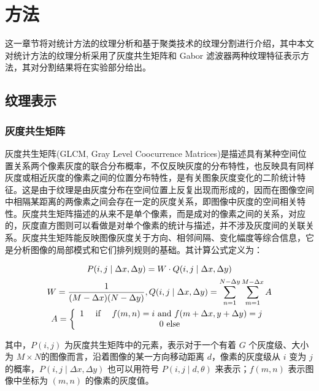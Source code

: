 \section{方法} 
\label{sec:proposed}

这一章节将对统计方法的纹理分析和基于聚类技术的纹理分割进行介绍，其中本文对统计方法的纹理分析采用了灰度共生矩阵和 Gabor 滤波器两种纹理特征表示方法，其对分割结果将在实验部分给出。

\subsection{纹理表示}

\subsubsection{灰度共生矩阵}

灰度共生矩阵(GLCM, Gray Level Coocurrence Matrices)是描述具有某种空间位置关系两个像素灰度的联合分布概率，不仅反映灰度的分布特性，也反映具有同样灰度或相近灰度的像素之间的位置分布特性，是有关图象灰度变化的二阶统计特征。这是由于纹理是由灰度分布在空间位置上反复出现而形成的，因而在图像空间中相隔某距离的两像素之间会存在一定的灰度关系，即图像中灰度的空间相关特性。灰度共生矩阵描述的从来不是单个像素，而是成对的像素之间的关系，对应的，灰度直方图则可以看做是对单个像素的统计与描述，并不涉及灰度间的关联关系。灰度共生矩阵能反映图像灰度关于方向、相邻间隔、变化幅度等综合信息，它是分析图像的局部模式和它们排列规则的基础。其计算公式定义为：

\begin{equation}
\begin{gathered}
P(i, j \mid \Delta x, \Delta y)=W \cdot Q(i, j \mid \Delta x, \Delta y) \\
W=\frac{1}{(M-\Delta x)(N-\Delta y)}, Q(i, j \mid \Delta x, \Delta y)=\sum_{n=1}^{N-\Delta y} \sum_{m=1}^{M-\Delta x} A \\
A=\left\{\begin{array}{cc}
1 \quad \text { if } \quad f(m, n)=i \text { and } f(m+\Delta x, y+\Delta y)=j \\
0 \text { else }
\end{array}\right.
\end{gathered}
\vspace{0.5cm}
\end{equation}

其中，$P(i,j)$ 为灰度共生矩阵中的元素，表示对于一个有着 $G$ 个灰度级、大小为 $M \times N$的图像而言，沿着图像的某一方向移动距离 $d$，像素的灰度级从 $i$ 变为 $j$ 的概率，$P(i, j \mid \Delta x, \Delta y)$ 也可以用符号 $P(i, j \mid d, \theta)$ 来表示；$f(m,n)$ 表示图像中坐标为 $(m,n)$ 的像素的灰度值。

